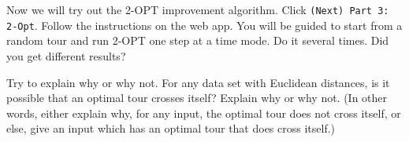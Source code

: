 \documentclass[twoside]{article}%
\begin{document}
Now we will try out the 2-OPT improvement algorithm.  Click \texttt{(Next) Part 3: 2-Opt}.  Follow the instructions on the web app.  You will be guided to start from a random tour and run 2-OPT one step at a time mode. Do it several times. Did you get
different results? 
\vskip 2in

Try to explain why or why not. For any data set with Euclidean distances, is it possible that an optimal tour crosses itself?
Explain why or why not. (In other words, either explain why, for any input, the
optimal tour does not cross itself, or else, give an input which
has an optimal tour that does cross itself.)











\end{document}
